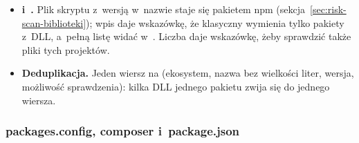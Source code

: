 \begin{itemize}
        frameworkowe, ale mają własne wersje, więc referencja GAC do nich jest raportowana.
        Inny zestaw z~wersją to komponent GAC -- wiersz do ręcznej weryfikacji.
  \item \textbf{ i~.} Plik skryptu z~wersją w~nazwie staje się
        pakietem npm (sekcja~\ref{sec:risk-scan-biblioteki}); wpis 
        daje wskazówkę, że klasyczny  wymienia tylko pakiety z~DLL, a~pełną
        listę widać w~. Liczba  daje
        wskazówkę, żeby sprawdzić także pliki tych projektów.
  \item \textbf{Deduplikacja.} Jeden wiersz na (ekosystem, nazwa bez wielkości liter, wersja,
        możliwość sprawdzenia): kilka DLL jednego pakietu zwija się do jednego wiersza.
\end{itemize}

\subsubsection{packages.config, composer i~package.json}

